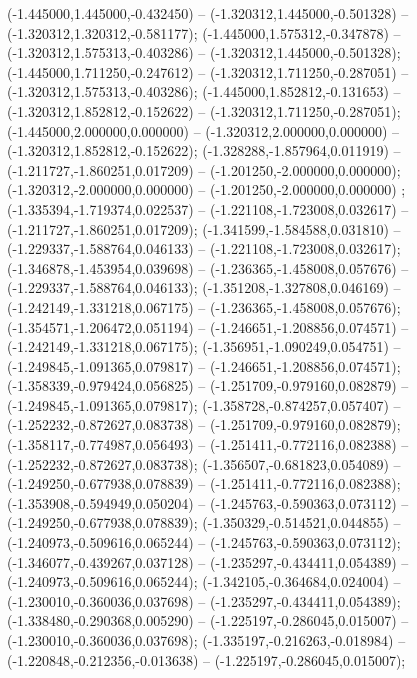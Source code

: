  (-1.445000,1.445000,-0.432450) -- (-1.320312,1.445000,-0.501328) -- (-1.320312,1.320312,-0.581177);
 (-1.445000,1.575312,-0.347878) -- (-1.320312,1.575313,-0.403286) -- (-1.320312,1.445000,-0.501328);
 (-1.445000,1.711250,-0.247612) -- (-1.320312,1.711250,-0.287051) -- (-1.320312,1.575313,-0.403286);
 (-1.445000,1.852812,-0.131653) -- (-1.320312,1.852812,-0.152622) -- (-1.320312,1.711250,-0.287051);
 (-1.445000,2.000000,0.000000) -- (-1.320312,2.000000,0.000000) -- (-1.320312,1.852812,-0.152622);
 (-1.328288,-1.857964,0.011919) -- (-1.211727,-1.860251,0.017209) -- (-1.201250,-2.000000,0.000000);
 (-1.320312,-2.000000,0.000000) -- (-1.201250,-2.000000,0.000000) ;
 (-1.335394,-1.719374,0.022537) -- (-1.221108,-1.723008,0.032617) -- (-1.211727,-1.860251,0.017209);
 (-1.341599,-1.584588,0.031810) -- (-1.229337,-1.588764,0.046133) -- (-1.221108,-1.723008,0.032617);
 (-1.346878,-1.453954,0.039698) -- (-1.236365,-1.458008,0.057676) -- (-1.229337,-1.588764,0.046133);
 (-1.351208,-1.327808,0.046169) -- (-1.242149,-1.331218,0.067175) -- (-1.236365,-1.458008,0.057676);
 (-1.354571,-1.206472,0.051194) -- (-1.246651,-1.208856,0.074571) -- (-1.242149,-1.331218,0.067175);
 (-1.356951,-1.090249,0.054751) -- (-1.249845,-1.091365,0.079817) -- (-1.246651,-1.208856,0.074571);
 (-1.358339,-0.979424,0.056825) -- (-1.251709,-0.979160,0.082879) -- (-1.249845,-1.091365,0.079817);
 (-1.358728,-0.874257,0.057407) -- (-1.252232,-0.872627,0.083738) -- (-1.251709,-0.979160,0.082879);
 (-1.358117,-0.774987,0.056493) -- (-1.251411,-0.772116,0.082388) -- (-1.252232,-0.872627,0.083738);
 (-1.356507,-0.681823,0.054089) -- (-1.249250,-0.677938,0.078839) -- (-1.251411,-0.772116,0.082388);
 (-1.353908,-0.594949,0.050204) -- (-1.245763,-0.590363,0.073112) -- (-1.249250,-0.677938,0.078839);
 (-1.350329,-0.514521,0.044855) -- (-1.240973,-0.509616,0.065244) -- (-1.245763,-0.590363,0.073112);
 (-1.346077,-0.439267,0.037128) -- (-1.235297,-0.434411,0.054389) -- (-1.240973,-0.509616,0.065244);
 (-1.342105,-0.364684,0.024004) -- (-1.230010,-0.360036,0.037698) -- (-1.235297,-0.434411,0.054389);
 (-1.338480,-0.290368,0.005290) -- (-1.225197,-0.286045,0.015007) -- (-1.230010,-0.360036,0.037698);
 (-1.335197,-0.216263,-0.018984) -- (-1.220848,-0.212356,-0.013638) -- (-1.225197,-0.286045,0.015007);
